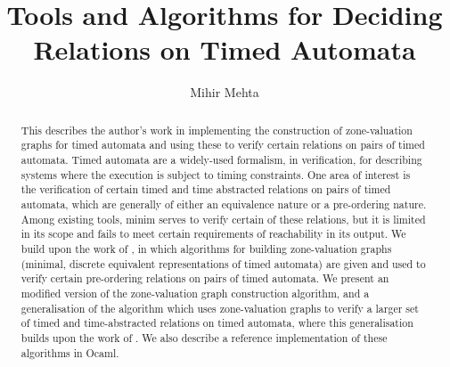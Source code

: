 \documentclass[a4paper]{llncs}
\begin{document}
\mainmatter

\title{Tools and Algorithms for Deciding Relations on Timed Automata}

\author{Mihir Mehta}



\maketitle

\begin{abstract}
  This describes the author's work in implementing the construction of
  zone-valuation graphs for timed automata and using these to verify
  certain relations on pairs of timed automata.
  Timed automata are a widely-used formalism, in verification, for
  describing systems where the execution is subject to timing
  constraints. One area of interest is the verification of certain
  timed and time abstracted relations on pairs of timed automata,
  which are generally of either an equivalence nature or a
  pre-ordering nature. Among existing tools, minim
  \cite{tripakis2001analysis} serves to verify certain of these
  relations, but it is limited in its scope and fails to meet certain
  requirements of reachability in its output. We build upon the work
  of \cite{DBLP:conf/cav/GuhaNA12}, in which algorithms for building
  zone-valuation graphs (minimal, discrete equivalent representations
  of timed automata) are given and used to verify certain pre-ordering
  relations on pairs of timed automata. We present an modified version
  of the zone-valuation graph construction algorithm, and a
  generalisation of the algorithm which uses zone-valuation graphs to
  verify a larger set of timed and time-abstracted relations on timed
  automata, where this generalisation builds upon the work of
  \cite{arun2006bisimilarities}. We also describe a reference
  implementation of these algorithms in Ocaml.
\end{abstract}
\pagebreak
\end{document}
